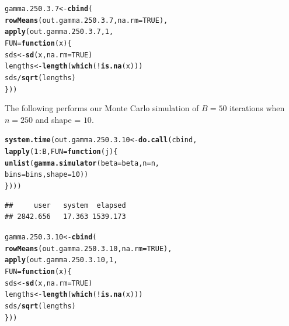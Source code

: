 \documentclass[11pt]{article}\usepackage[]{graphicx}\usepackage[]{color}
\makeatletter
\newcommand{\hlnum}[1]{\textcolor[rgb]{0.686,0.059,0.569}{#1}}%
\newcommand{\hlopt}[1]{\textcolor[rgb]{0,0,0}{#1}}%
\newcommand{\hlstd}[1]{\textcolor[rgb]{0.345,0.345,0.345}{#1}}%
\newcommand{\hlkwa}[1]{\textcolor[rgb]{0.161,0.373,0.58}{\textbf{#1}}}%
\newcommand{\hlkwb}[1]{\textcolor[rgb]{0.69,0.353,0.396}{#1}}%
\newcommand{\hlkwc}[1]{\textcolor[rgb]{0.333,0.667,0.333}{#1}}%
\newcommand{\hlkwd}[1]{\textcolor[rgb]{0.737,0.353,0.396}{\textbf{#1}}}%
\newenvironment{kframe}{%
 \def\at@end@of@kframe{}%
 \ifinner\ifhmode%
  \def\at@end@of@kframe{\end{minipage}}%
  \begin{minipage}{\columnwidth}%
 \fi\fi%
 \def\FrameCommand##1{\hskip\@totalleftmargin \hskip-\fboxsep
 \colorbox{shadecolor}{##1}\hskip-\fboxsep
     \hskip-\linewidth \hskip-\@totalleftmargin \hskip\columnwidth}%
 \MakeFramed {\advance\hsize-\width
   \@totalleftmargin\z@ \linewidth\hsize
   \@setminipage}}%
 {\par\unskip\endMakeFramed%
 \at@end@of@kframe}
\newenvironment{knitrout}{}{} %
\makeatother
\begin{document}
\begin{knitrout}
\color{fgcolor}\begin{kframe}
\begin{alltt}
\hlstd{gamma.250.3.7} \hlkwb{<-} \hlkwd{cbind}\hlstd{(}
  \hlkwd{rowMeans}\hlstd{(out.gamma.250.3.7,} \hlkwc{na.rm} \hlstd{=} \hlnum{TRUE}\hlstd{),}
  \hlkwd{apply}\hlstd{(out.gamma.250.3.7,} \hlnum{1}\hlstd{,}
  \hlkwc{FUN} \hlstd{=} \hlkwa{function}\hlstd{(}\hlkwc{x}\hlstd{)\{}
    \hlstd{sds} \hlkwb{<-} \hlkwd{sd}\hlstd{(x,} \hlkwc{na.rm} \hlstd{=} \hlnum{TRUE}\hlstd{)}
    \hlstd{lengths} \hlkwb{<-} \hlkwd{length}\hlstd{(}\hlkwd{which}\hlstd{(}\hlopt{!}\hlkwd{is.na}\hlstd{(x)))}
    \hlstd{sds} \hlopt{/} \hlkwd{sqrt}\hlstd{(lengths)}
  \hlstd{\}))}
\end{alltt}
\end{kframe}
\end{knitrout}

The following performs our Monte Carlo simulation of $B = 50$ iterations 
when $n = 250$ and shape = $10$.

\begin{knitrout}
\color{fgcolor}\begin{kframe}
\begin{alltt}
\hlkwd{system.time}\hlstd{(out.gamma.250.3.10} \hlkwb{<-} \hlkwd{do.call}\hlstd{(cbind,}
  \hlkwd{lapply}\hlstd{(}\hlnum{1}\hlopt{:}\hlstd{B,} \hlkwc{FUN} \hlstd{=} \hlkwa{function}\hlstd{(}\hlkwc{j}\hlstd{)\{}
    \hlkwd{unlist}\hlstd{(}\hlkwd{gamma.simulator}\hlstd{(}\hlkwc{beta} \hlstd{= beta,} \hlkwc{n} \hlstd{= n,}
      \hlkwc{bins} \hlstd{= bins,} \hlkwc{shape} \hlstd{=} \hlnum{10}\hlstd{))}
\hlstd{\})))}
\end{alltt}
\begin{verbatim}
##     user   system  elapsed 
## 2842.656   17.363 1539.173
\end{verbatim}
\end{kframe}
\end{knitrout}

\begin{knitrout}
\color{fgcolor}\begin{kframe}
\begin{alltt}
\hlstd{gamma.250.3.10} \hlkwb{<-} \hlkwd{cbind}\hlstd{(}
  \hlkwd{rowMeans}\hlstd{(out.gamma.250.3.10,} \hlkwc{na.rm} \hlstd{=} \hlnum{TRUE}\hlstd{),}
  \hlkwd{apply}\hlstd{(out.gamma.250.3.10,} \hlnum{1}\hlstd{,}
  \hlkwc{FUN} \hlstd{=} \hlkwa{function}\hlstd{(}\hlkwc{x}\hlstd{)\{}
    \hlstd{sds} \hlkwb{<-} \hlkwd{sd}\hlstd{(x,} \hlkwc{na.rm} \hlstd{=} \hlnum{TRUE}\hlstd{)}
    \hlstd{lengths} \hlkwb{<-} \hlkwd{length}\hlstd{(}\hlkwd{which}\hlstd{(}\hlopt{!}\hlkwd{is.na}\hlstd{(x)))}
    \hlstd{sds} \hlopt{/} \hlkwd{sqrt}\hlstd{(lengths)}
  \hlstd{\}))}
\end{alltt}
\end{kframe}
\end{knitrout}
\end{document}
